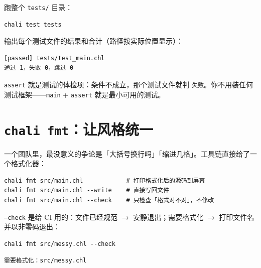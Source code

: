 跑整个 \texttt{tests/\allowbreak{}} 目录：

\par
\medskip
\begin{lstlisting}[style=sh]
chali test tests
\end{lstlisting}
\par
\medskip

输出每个测试文件的结果和合计（路径按实际位置显示）：

\par
\medskip
\begin{lstlisting}[style=out]
[passed] tests/test_main.chl
通过 1，失败 0，跳过 0
\end{lstlisting}
\par
\medskip

\texttt{assert} 就是测试的体检项：条件不成立，那个测试文件就判 \texttt{失败}。你不用装任何测试框架——\texttt{main} + \texttt{assert} 就是最小可用的测试。

\section{\texttt{chali fmt}：让风格统一}

一个团队里，最没意义的争论是「大括号换行吗」「缩进几格」。工具链直接给了一个格式化器：

\par
\medskip
\begin{lstlisting}[style=sh]
chali fmt src/main.chl            # 打印格式化后的源码到屏幕
chali fmt src/main.chl --write    # 直接写回文件
chali fmt src/main.chl --check    # 只检查「格式对不对」，不修改
\end{lstlisting}
\par
\medskip

\texttt{--check} 是给 CI 用的：文件已经规范 \ensuremath{\rightarrow} 安静退出；需要格式化 \ensuremath{\rightarrow} 打印文件名并以非零码退出：

\par
\medskip
\begin{lstlisting}[style=sh]
chali fmt src/messy.chl --check
\end{lstlisting}
\par
\medskip

\par
\medskip
\begin{lstlisting}[style=out]
需要格式化：src/messy.chl
\end{lstlisting}
\par
\medskip

